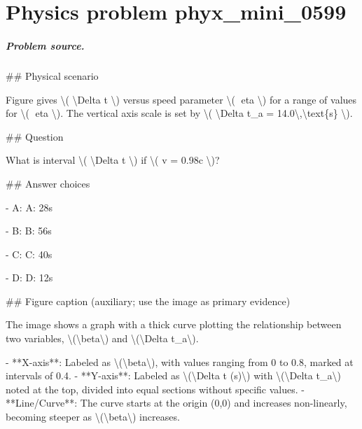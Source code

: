 
\chapter{Physics problem phyx\_mini\_0599}
\label{ch:PhyXMiniProblems_problem_phyx_mini_0599}

\paragraph{Problem source.}
\#\# Physical scenario

Figure gives \textbackslash{}( \textbackslash{}Delta t \textbackslash{}) versus speed parameter \textbackslash{}( eta \textbackslash{}) for a range of values for \textbackslash{}( eta \textbackslash{}). The vertical axis scale is set by \textbackslash{}( \textbackslash{}Delta t\_a = 14.0\textbackslash{},\textbackslash{}text\{s\} \textbackslash{}).

\#\# Question

What is interval \textbackslash{}( \textbackslash{}Delta t \textbackslash{}) if \textbackslash{}( v = 0.98c \textbackslash{})?

\#\# Answer choices

- A: A: 28s

- B: B: 56s

- C: C: 40s

- D: D: 12s

\#\# Figure caption (auxiliary; use the image as primary evidence)

The image shows a graph with a thick curve plotting the relationship between two variables, \textbackslash{}(\textbackslash{}beta\textbackslash{}) and \textbackslash{}(\textbackslash{}Delta t\_a\textbackslash{}). 

- **X-axis**: Labeled as \textbackslash{}(\textbackslash{}beta\textbackslash{}), with values ranging from 0 to 0.8, marked at intervals of 0.4.
- **Y-axis**: Labeled as \textbackslash{}(\textbackslash{}Delta t (s)\textbackslash{}) with \textbackslash{}(\textbackslash{}Delta t\_a\textbackslash{}) noted at the top, divided into equal sections without specific values.
- **Line/Curve**: The curve starts at the origin (0,0) and increases non-linearly, becoming steeper as \textbackslash{}(\textbackslash{}beta\textbackslash{}) increases.

